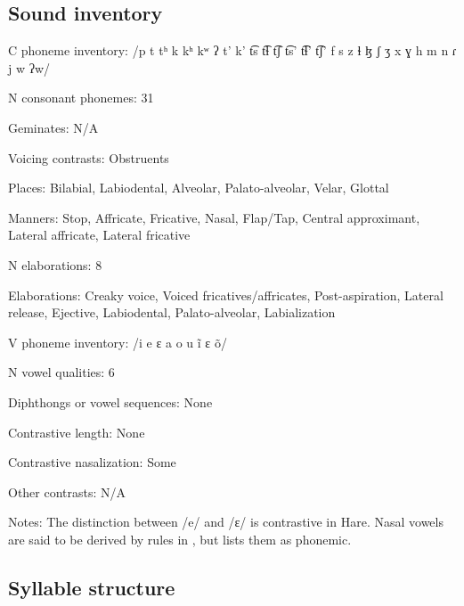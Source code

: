 {\subsection*{Sound inventory}
\begin{appendixdesc}

\item[C phoneme inventory:] /p t tʰ k kʰ kʷ ʔ t’ k’ t͡s t͡ɬ t͡ʃ t͡s’ t͡ɬ’ t͡ʃ’ f s z ɬ ɮ ʃ ʒ x ɣ h m n ɾ j w ʔw/

\item[N consonant phonemes:] 31

\item[Geminates:] N/A

\item[Voicing contrasts:] Obstruents

\item[Places:] Bilabial, Labiodental, Alveolar, Palato-alveolar, Velar, Glottal

\item[Manners:] Stop, Affricate, Fricative, Nasal, Flap/Tap, Central approximant, Lateral affricate, Lateral fricative

\item[N elaborations:] 8

\item[Elaborations:] Creaky voice, Voiced fricatives/affricates, Post-aspiration, Lateral release, Ejective, Labiodental, Palato-alveolar, Labialization

\item[V phoneme inventory:] /i e ɛ a o u ĩ ɛ õ/

\item[N vowel qualities:] 6

\item[Diphthongs or vowel sequences:] None

\item[Contrastive length:] None

\item[Contrastive nasalization:] Some

\item[Other contrasts:] N/A

\item[Notes:] The distinction between /e/ and /ɛ/ is contrastive in Hare. Nasal vowels are said to be derived by rules in \citet{Rice1989}, but \citet{Rice2005} lists them as phonemic.
\end{appendixdesc}
\subsection*{Syllable structure}
\begin{appendixdesc}


\end{appendixdesc}}
